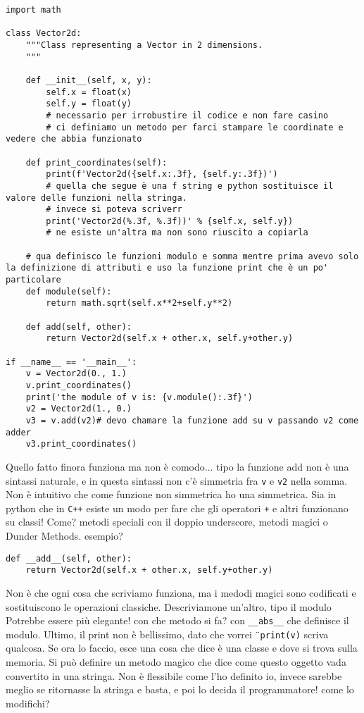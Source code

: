 \documentclass[10pt, a4paper, titlepage]{book}
\begin{document}
\begin{verbatim}
import math

class Vector2d:
	"""Class representing a Vector in 2 dimensions.
	"""

	def __init__(self, x, y):
		self.x = float(x) 
		self.y = float(y) 
		# necessario per irrobustire il codice e non fare casino
		# ci definiamo un metodo per farci stampare le coordinate e vedere che abbia funzionato
	
	def print_coordinates(self):
		print(f'Vector2d({self.x:.3f}, {self.y:.3f})')
		# quella che segue è una f string e python sostituisce il valore delle funzioni nella stringa.
		# invece si poteva scriverr
		print('Vector2d(%.3f, %.3f))' % {self.x, self.y})
		# ne esiste un'altra ma non sono riuscito a copiarla
	
	# qua definisco le funzioni modulo e somma mentre prima avevo solo la definizione di attributi e uso la funzione print che è un po' particolare
	def module(self):
		return math.sqrt(self.x**2+self.y**2)

	def add(self, other):
		return Vector2d(self.x + other.x, self.y+other.y)

if __name__ == '__main__':
	v = Vector2d(0., 1.)
	v.print_coordinates()
	print('the module of v is: {v.module():.3f}')
	v2 = Vector2d(1., 0.)
	v3 = v.add(v2)# devo chamare la funzione add su v passando v2 come adder
	v3.print_coordinates()
\end{verbatim}

Quello fatto finora funziona ma non è comodo... tipo la funzione add non è una sintassi naturale, e in questa sintassi non c'è simmetria fra \texttt{v} e \texttt{v2} nella somma. Non è intuitivo che come funzione non simmetrica ho una simmetrica.
Sia in python che in \texttt{C++} esiste un modo per fare che gli operatori \texttt{+} e altri funzionano su classi!
Come? metodi speciali con il doppio underscore, metodi magici o Dunder Methods.
esempio? 

\begin{verbatim}
def __add__(self, other):
	return Vector2d(self.x + other.x, self.y+other.y)
\end{verbatim}

Non è che ogni cosa che scriviamo funziona, ma i medodi magici sono codificati e sostituiscono le operazioni classiche.
Descriviamone un'altro, tipo il modulo
Potrebbe essere più elegante! con che metodo si fa? con \texttt{__abs__} che definisce il modulo.
Ultimo, il print non è bellissimo, dato che vorrei ¨\texttt{print(v)} scriva qualcosa. Se ora lo faccio, esce una cosa che dice è una classe e dove si trova sulla memoria.
Si può definire un metodo magico che dice come questo oggetto vada convertito in una stringa.
Non è flessibile come l'ho definito io, invece sarebbe meglio se ritornasse la stringa e basta, e poi lo decida il programmatore!
come lo modifichi?
\end{document}
